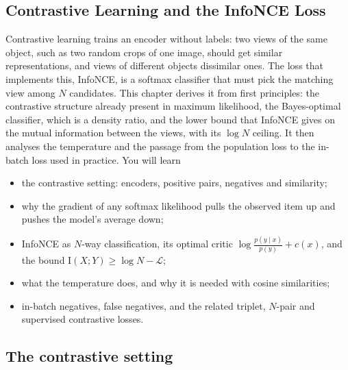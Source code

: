 \begin{notechapter}
\chapter{Contrastive Learning and the InfoNCE Loss}\label{ch:contrastive-learning}

\begin{chapterintro}
Contrastive learning trains an encoder without labels: two views of the same object, such as
two random crops of one image, should get similar representations, and views of different
objects dissimilar ones. The loss that implements this, InfoNCE, is a softmax classifier that
must pick the matching view among $N$ candidates. This chapter derives it from first principles:
the contrastive structure already present in maximum likelihood, the Bayes-optimal
classifier, which is a density ratio, and the lower bound that InfoNCE gives on the mutual
information between the views, with its $\log N$ ceiling. It then analyses the temperature and the
passage from the population loss to the in-batch loss used in practice. You will learn
\begin{itemize}[nosep]
  \item the contrastive setting: encoders, positive pairs, negatives and similarity;
  \item why the gradient of any softmax likelihood pulls the observed item up and pushes the
        model's average down;
  \item InfoNCE as $N$-way classification, its optimal critic $\log\frac{p(y\mid x)}{p(y)} + c(x)$, and the bound $\mathrm I(X; Y)\geq\log N - \mathcal L$;
  \item what the temperature does, and why it is needed with cosine similarities;
  \item in-batch negatives, false negatives, and the related triplet, $N$-pair and supervised
        contrastive losses.
\end{itemize}
\end{chapterintro}

\section{The contrastive setting}\label{contrastive-learning:sec:setting}


\end{notechapter}

